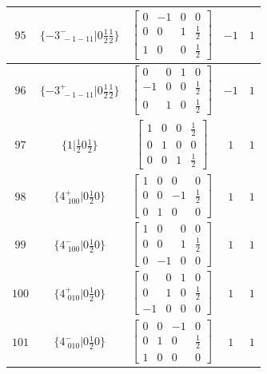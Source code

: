 \documentclass[fleqn,8pt]{jsarticle}
\begin{document}
\begin{longtable}{ccccc}
$ 95 $ & $ \{-3^{-}_{\,\,-1-11}|0 \frac{1}{2} \frac{1}{2}\} $ & $ \begin{bmatrix} 0 & -1 & 0 & 0 \\ 0 & 0 & 1 & \frac{1}{2} \\ 1 & 0 & 0 & \frac{1}{2} \end{bmatrix} $ & $ -1 $ & $ 1 $ \\ \hline
$ 96 $ & $ \{-3^{+}_{\,\,-1-11}|0 \frac{1}{2} \frac{1}{2}\} $ & $ \begin{bmatrix} 0 & 0 & 1 & 0 \\ -1 & 0 & 0 & \frac{1}{2} \\ 0 & 1 & 0 & \frac{1}{2} \end{bmatrix} $ & $ -1 $ & $ 1 $ \\ \hline
$ 97 $ & $ \{1|\frac{1}{2} 0 \frac{1}{2}\} $ & $ \begin{bmatrix} 1 & 0 & 0 & \frac{1}{2} \\ 0 & 1 & 0 & 0 \\ 0 & 0 & 1 & \frac{1}{2} \end{bmatrix} $ & $ 1 $ & $ 1 $ \\ \hline
$ 98 $ & $ \{4^{+}_{\,\,100}|0 \frac{1}{2} 0\} $ & $ \begin{bmatrix} 1 & 0 & 0 & 0 \\ 0 & 0 & -1 & \frac{1}{2} \\ 0 & 1 & 0 & 0 \end{bmatrix} $ & $ 1 $ & $ 1 $ \\ \hline
$ 99 $ & $ \{4^{-}_{\,\,100}|0 \frac{1}{2} 0\} $ & $ \begin{bmatrix} 1 & 0 & 0 & 0 \\ 0 & 0 & 1 & \frac{1}{2} \\ 0 & -1 & 0 & 0 \end{bmatrix} $ & $ 1 $ & $ 1 $ \\ \hline
$ 100 $ & $ \{4^{+}_{\,\,010}|0 \frac{1}{2} 0\} $ & $ \begin{bmatrix} 0 & 0 & 1 & 0 \\ 0 & 1 & 0 & \frac{1}{2} \\ -1 & 0 & 0 & 0 \end{bmatrix} $ & $ 1 $ & $ 1 $ \\ \hline
$ 101 $ & $ \{4^{-}_{\,\,010}|0 \frac{1}{2} 0\} $ & $ \begin{bmatrix} 0 & 0 & -1 & 0 \\ 0 & 1 & 0 & \frac{1}{2} \\ 1 & 0 & 0 & 0 \end{bmatrix} $ & $ 1 $ & $ 1 $ \\ \hline

\end{longtable}
\end{document}
